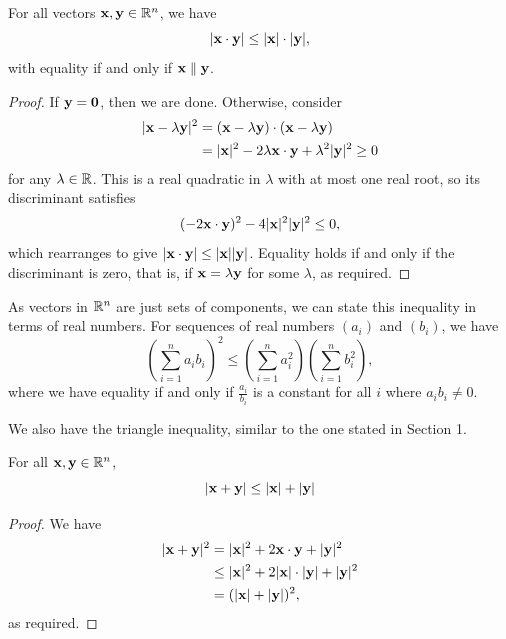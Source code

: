 \documentclass[a4paper]{scrartcl}
\begin{document}
\begin{proposition}
    For all vectors $\mathbf{x}, \mathbf{y} \in \mathbb{R}^n$, we have
    $$
|\mathbf{x} \cdot \mathbf{y}| \leq |\mathbf{x} | \cdot |\mathbf{y}|,
    $$
    with equality if and only if $\mathbf{x} \parallel \mathbf{y}$.
\end{proposition}
\begin{proof}
    If $\mathbf{y} = \mathbf{0}$, then we are done. Otherwise, consider
    \begin{align*}
        |\mathbf{x} - \lambda \mathbf{y}|^2 &= (\mathbf{x} - \lambda\mathbf{y}) \cdot (\mathbf{x} - \lambda \mathbf{y}) \\
        &= |\mathbf{x}|^2 - 2 \lambda \mathbf{x} \cdot \mathbf{y} + \lambda^2 |\mathbf{y}|^2 \geq 0
    \end{align*}
    for any $\lambda \in \mathbb{R}$. This is a real quadratic in $\lambda$ with at most one real root, so its discriminant satisfies
    $$
    (-2 \mathbf{x} \cdot \mathbf{y})
^2 - 4|\mathbf{x}|^2 |\mathbf{y}|^2 \leq 0,    $$
which rearranges to give $|\mathbf{x} \cdot \mathbf{y}| \leq |\mathbf{x}||\mathbf{y}|$. Equality holds if and only if the discriminant is zero, that is, if $\mathbf{x} = \lambda \mathbf{y}$ for some $\lambda$, as required.
\end{proof}

As vectors in $\mathbb{R}^n$ are just sets of components, we can state this inequality in terms of real numbers.
    For sequences of real numbers $(a_i)$ and $(b_i)$, we have
    $$
\left(\sum_{i = 1}^n a_i b_i\right)^2 \leq \left(\sum_{i = 1}^n a_i^2 \right)\left(\sum_{i = 1}^n b_i^2 \right),
    $$
    where we have equality if and only if $\frac{a_i}{b_i}$ is a constant for all $i$ where $a_i b_i \neq 0$.

We also have the triangle inequality, similar to the one stated in Section 1.

\begin{proposition}
    For all $\mathbf{x},\mathbf{y} \in \mathbb{R}^n$,
    $$
    |\mathbf{x} + \mathbf{y} |\leq |\mathbf{x}| + |\mathbf{y}|
    $$
\end{proposition}
\begin{proof}
We have
\begin{align*}
    |\mathbf{x} + \mathbf{y}|^2 &= |\mathbf{x}|^2 + 2 \mathbf{x}\cdot \mathbf{y} + |\mathbf{y}|^2 \\
    &\leq |\mathbf{x}|^2 + 2 |\mathbf{x}| \cdot |\mathbf{y}| + |\mathbf{y}|^2 \\
    &= (|\mathbf{x}| + |\mathbf{y}|)^2,
\end{align*}
as required.
\end{proof}
\end{document}
